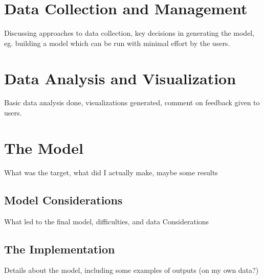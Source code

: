 \chapter{Data Collection and Management}
Discussing approaches to data collection, key decisions in generating the model, eg. building a model which can be run with minimal effort by the users.

\chapter{Data Analysis and Visualization}
Basic data analysis done, visualizations generated, comment on feedback given to users.
\chapter{The Model}
What was the target, what did I actually make, maybe some results
\section{Model Considerations}
What led to the final model, difficulties, and data Considerations

\section{The Implementation}
Details about the model, including some examples of outputs (on my own data?)


